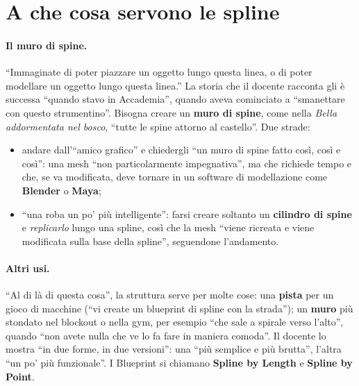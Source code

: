 \section{A che cosa servono le spline}
\label{ue16:sec:usi}

\paragraph{Il muro di spine.} ``Immaginate di poter piazzare un oggetto lungo questa linea, o
di poter modellare un oggetto lungo questa linea.'' La storia che il docente racconta gli è
successa ``quando stavo in Accademia'', quando aveva cominciato a ``smanettare con questo
strumentino''. Bisogna creare un \textbf{muro di spine}, come nella \emph{Bella addormentata
nel bosco}, ``tutte le spine attorno al castello''. Due strade:
\begin{itemize}
  \item andare dall'``amico grafico'' e chiedergli ``un muro di spine fatto così, così e così'':
        una mesh ``non particolarmente impegnativa'', ma che richiede tempo e che, se va
        modificata, deve tornare in un software di modellazione come \textbf{Blender} o
        \textbf{Maya};
  \item ``una roba un po' più intelligente'': farsi creare soltanto un \textbf{cilindro di
        spine} e \emph{replicarlo} lungo una spline, così che la mesh ``viene ricreata e viene
        modificata sulla base della spline'', seguendone l'andamento.
\end{itemize}

\paragraph{Altri usi.} ``Al di là di questa cosa'', la struttura serve per molte cose: una
\textbf{pista} per un gioco di macchine (``vi create un blueprint di spline con la strada''); un
\textbf{muro} più stondato nel blockout o nella gym, per esempio ``che sale a spirale verso
l'alto'', quando ``non avete nulla che ve lo fa fare in maniera comoda''. Il docente lo mostra
``in due forme, in due versioni'': una ``più semplice e più brutta'', l'altra ``un po' più
funzionale''. I Blueprint si chiamano \textbf{Spline by Length} e \textbf{Spline by Point}.

